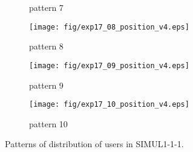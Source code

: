 \begin{figure}
\begin{center}
\begin{subfigure}[b]{0.32\textwidth}
				\caption{pattern 7}
				\label{figure:simul1_1_1_g}
			\end{subfigure}
			\begin{subfigure}[b]{0.32\textwidth}
				\texttt{[image: fig/exp17\_08\_position\_v4.eps]}
				\caption{pattern 8}
				\label{figure:simul1_1_1_h}
			\end{subfigure}
			\begin{subfigure}[b]{0.32\textwidth}
				\texttt{[image: fig/exp17\_09\_position\_v4.eps]}
				\caption{pattern 9}
				\label{figure:simul1_1_1_i}
			\end{subfigure}
			\begin{subfigure}[b]{0.32\textwidth}
				\texttt{[image: fig/exp17\_10\_position\_v4.eps]}
				\caption{pattern 10}
				\label{figure:simul1_1_1_j}
			\end{subfigure}
			\caption{Patterns of distribution of users in SIMUL1-1-1.}
			\label{figure:simul1_1_1_p}
		\end{center}
	\end{figure}

